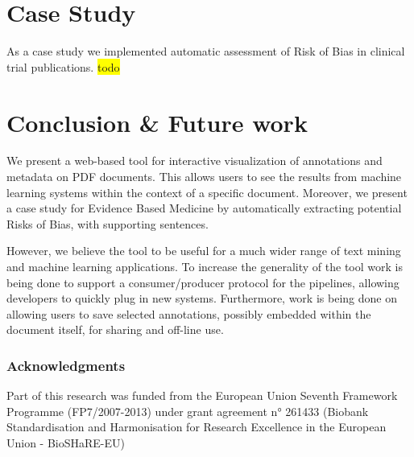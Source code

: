 \documentclass[runningheads,a4paper]{llncs}
\newcommand{\highlight}[1]{\colorbox{yellow}{#1}}
\begin{document}
\section{Case Study}
\label{sec-3}
As a case study we implemented automatic assessment of Risk of Bias in clinical trial publications.
\highlight{todo}
\section{Conclusion \& Future work}
\label{sec-4}
We present a web-based tool for interactive visualization of annotations and metadata on PDF documents.
This allows users to see the results from machine learning systems within the context of a specific document.
Moreover, we present a case study for Evidence Based Medicine by automatically extracting potential Risks of Bias, with supporting sentences.

However, we believe the tool to be useful for a much wider range of text mining and machine learning applications.
To increase the generality of the tool work is being done to support a consumer/producer protocol for the pipelines, allowing developers to quickly plug in new systems.
Furthermore, work is being done on allowing users to save selected annotations, possibly embedded within the document itself, for sharing and off-line use.

\subsubsection{Acknowledgments}
\label{sec-4-0-1}
Part of this research was funded from the European Union Seventh Framework Programme (FP7/2007-2013) under grant agreement n° 261433 (Biobank Standardisation and Harmonisation for Research Excellence in the European Union - BioSHaRE-EU)



\end{document}
